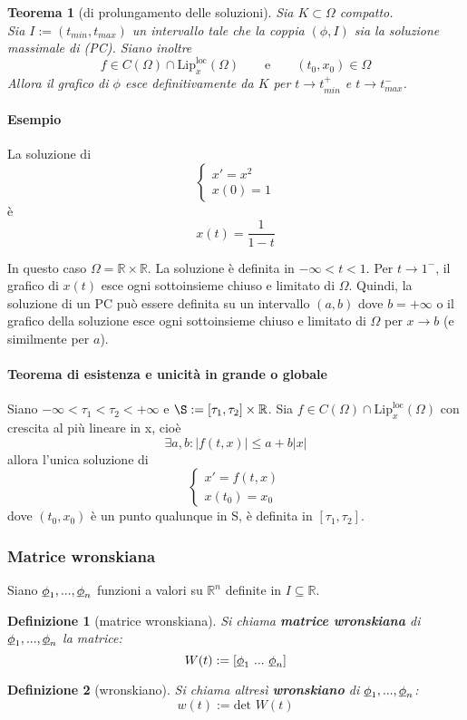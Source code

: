 \documentclass[a4paper,12pt]{article}
\newtheorem{teo}{Teorema}
\newtheorem{defi}{Definizione}
\begin{document}
\begin{teo}[di prolungamento delle soluzioni]
Sia $K\subset \Omega$ compatto.\\ Sia $I:=(t_{min},t_{max})$ un intervallo tale che la coppia $\left(\phi,I\right)$ sia la soluzione massimale di (PC).
Siano inoltre $$f \in C\left(\Omega\right) \cap \text{Lip}^{\text{loc}}_x\left(\Omega\right)\qquad \text{e} \qquad\left(t_0,x_0\right) \in \Omega$$
Allora il grafico di $\phi$ esce definitivamente da $K$ per $t\rightarrow t^+_{min}$ e $t\rightarrow t^-_{max}$.
\end{teo}



\paragraph{Esempio}
La soluzione di
$$ \begin{cases} x'=x^2 \\ x(0)=1 \end{cases} $$
è
$$ x(t)=\frac{1}{1-t}$$


In questo caso $\Omega = \mathbb{R} \times \mathbb{R}$. La soluzione è definita in $-\infty < t < 1$. Per $ t \rightarrow 1^-$, il grafico di $x(t)$ 
esce ogni sottoinsieme chiuso e limitato di $\Omega$. Quindi, la soluzione di un PC può essere definita su un intervallo $(a,b)$ dove $b=+\infty$ o il grafico della soluzione esce ogni sottoinsieme chiuso e limitato di $\Omega$ per $x \rightarrow b$ (e similmente per $a$). 


\paragraph{Teorema di esistenza e unicità in grande o globale}
Siano $-\infty < \tau_1 < \tau_2 < +\infty$ e $\S:=\left[\tau_1,\tau_2\right]\times\mathbb{R}$. Sia $f \in C\left(\Omega\right) \cap \text{Lip}^{\text{loc}}_x\left(\Omega\right)$ con crescita al più lineare in x, cioè
$$\exists a,b: |f \left(t,x\right)|\leq a + b|x|$$
allora l'unica soluzione di 
$$\begin{cases} x'=f\left(t,x\right) \\ x\left(t_0\right)=x_0 \end{cases}$$
dove $\left(t_0,x_0\right)$ è un punto qualunque in S, è definita in $\left[\tau_1,\tau_2\right]$.



\subsubsection{Matrice wronskiana}
Siano $\underbar{$\phi$}_1,...,\underbar{$\phi$}_n$ funzioni a valori su $\mathbb{R}^n$ definite in $I\subseteq \mathbb{R}$.
\begin{defi}[matrice wronskiana]
Si chiama \textbf{matrice wronskiana} di $\underbar{$\phi$}_1,...,\underbar{$\phi$}_n$ la matrice:
$$W(t):=[\underbar{$\phi$}_1\ ...\ \underbar{$\phi$}_n]$$
\end{defi}
\begin{defi}[wronskiano]
Si chiama altresì \textbf{wronskiano} di $\underbar{$\phi$}_1,...,\underbar{$\phi$}_n$:
$$w(t):=\text{det } W(t)$$
\end{defi}
\end{document}
